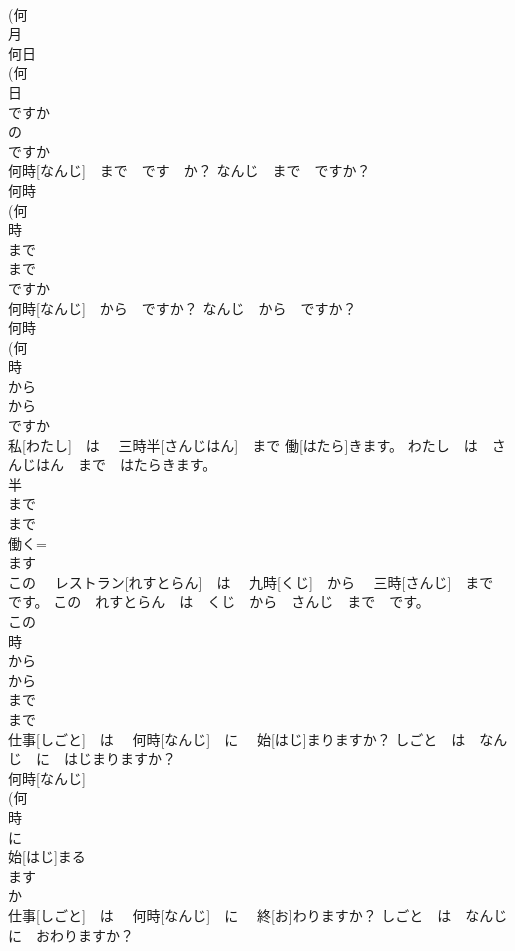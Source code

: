 \documentclass[8pt]{extreport}
\begin{document}
\begin{CJK}{UTF8}{min}
\\	(何 
\\	月 
\\	何日 
\\	(何 
\\	日 
\\	ですか 
\\	の 
\\	ですか 
\\	何時[なんじ]　まで　です　か？	なんじ　まで　ですか？	
\\	何時 
\\	(何 
\\	時 
\\	まで 
\\	まで 
\\	ですか 
\\	何時[なんじ]　から　ですか？	なんじ　から　ですか？	
\\	何時 
\\	(何 
\\	時 
\\	から 
\\	から 
\\	ですか 
\\	私[わたし]　は　 三時半[さんじはん]　まで 働[はたら]きます。	わたし　は　さんじはん　まで　はたらきます。	
\\	半 
\\	まで 
\\	まで 
\\	働く= 
\\	ます 
\\	この　 レストラン[れすとらん]　は　 九時[くじ]　から　 三時[さんじ]　まで　です。	この　れすとらん　は　くじ　から　さんじ　まで　です。	
\\	この 
\\	時 
\\	から 
\\	から 
\\	まで 
\\	まで 
\\	仕事[しごと]　は 　何時[なんじ]　に 　始[はじ]まりますか？	しごと　は　なんじ　に　はじまりますか？	
\\	何時[なんじ] 
\\	(何 
\\	時 
\\	に 
\\	始[はじ]まる 
\\	ます 
\\	か 
\\	仕事[しごと]　は 　何時[なんじ]　に 　終[お]わりますか？	しごと　は　なんじ　に　おわりますか？	

\end{CJK}
\end{document}

